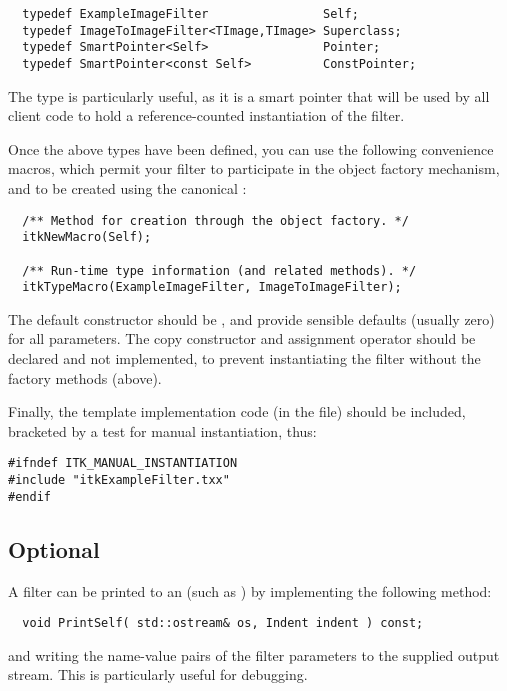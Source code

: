 \begin{verbatim}
  typedef ExampleImageFilter                Self;
  typedef ImageToImageFilter<TImage,TImage> Superclass;
  typedef SmartPointer<Self>                Pointer;
  typedef SmartPointer<const Self>          ConstPointer;
\end{verbatim}

The  type is particularly useful, as it is a smart pointer
that will be used by all client code to hold a reference-counted
instantiation of the filter. 

Once the above types have been defined, you can use the following
convenience macros, which permit your filter to participate in the object
factory mechanism, and to be created using the canonical :

\begin{verbatim}
  /** Method for creation through the object factory. */
  itkNewMacro(Self);  

  /** Run-time type information (and related methods). */
  itkTypeMacro(ExampleImageFilter, ImageToImageFilter);
\end{verbatim}

The default constructor should be , and provide sensible
defaults (usually zero) for all parameters.  The copy constructor and
assignment operator should be declared  and not implemented,
to prevent instantiating the filter without the factory methods (above). 

Finally, the template implementation code (in the  file) should
be included, bracketed by a test for manual instantiation, thus:

\begin{verbatim}
#ifndef ITK_MANUAL_INSTANTIATION
#include "itkExampleFilter.txx"
#endif
\end{verbatim}

\subsection{Optional}

A filter can be printed to an  (such as )
by implementing the following method:

\begin{verbatim}
  void PrintSelf( std::ostream& os, Indent indent ) const;
\end{verbatim}

\noindent and writing the name-value pairs of the filter parameters to the
supplied output stream.  This is particularly useful for debugging.

